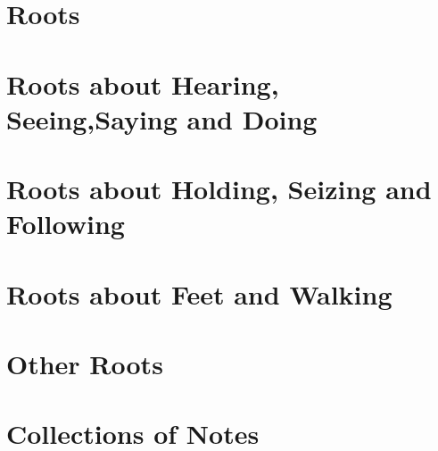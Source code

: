 \part{Roots}
\part{Roots about Hearing, Seeing,Saying and Doing}







\part{Roots about Holding, Seizing and Following}




\part{Roots about Feet and Walking} 







\part{Other Roots}













\part{Collections of Notes}





